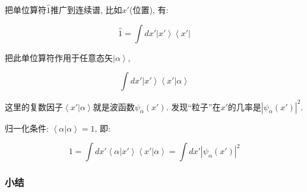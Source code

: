 把单位算符$\hat 1$推广到连续谱, 比如$ x' $(位置), 有:

\begin{equation*}
\hat 1 = \int dx' \left| x' \right\rangle \left\langle x' \right|
\end{equation*}

把此单位算符作用于任意态矢$\left| \alpha \right\rangle$,

\begin{equation*}
\int dx' \left| x' \right\rangle \left\langle x' | \alpha
\right\rangle
\end{equation*}

这里的复数因子$\left\langle x' | \alpha
\right\rangle$就是波函数$\psi_{\alpha}(x')$.
发现``粒子''在$x'$的几率是$\left| \psi_{\alpha}(x') \right|^2$.

归一化条件: $\left\langle \alpha | \alpha \right\rangle =1$, 即:

\begin{equation*}
1 = \int dx' \left\langle \alpha | x' \right\rangle \left\langle x'
| \alpha \right\rangle = \int dx' \left| \psi_{\alpha}(x')\right|^2
\end{equation*}

\subsubsection{小结}

